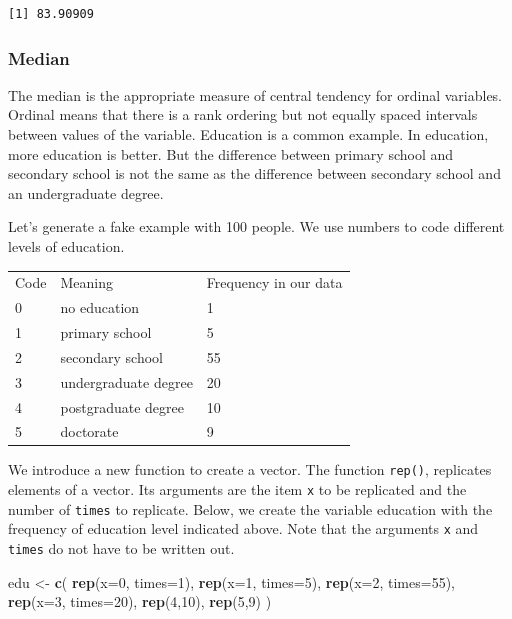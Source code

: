\documentclass[]{book}
\newenvironment{Shaded}{\begin{snugshade}}{\end{snugshade}}
\newcommand{\KeywordTok}[1]{\textcolor[rgb]{0.13,0.29,0.53}{\textbf{#1}}}
\newcommand{\DataTypeTok}[1]{\textcolor[rgb]{0.13,0.29,0.53}{#1}}
\newcommand{\DecValTok}[1]{\textcolor[rgb]{0.00,0.00,0.81}{#1}}
\newcommand{\StringTok}[1]{\textcolor[rgb]{0.31,0.60,0.02}{#1}}
\newcommand{\NormalTok}[1]{#1}
\theoremstyle{definition}
\theoremstyle{definition}
\theoremstyle{definition}
\theoremstyle{remark}
\begin{document}
\begin{verbatim}
[1] 83.90909
\end{verbatim}

\subsubsection{Median}\label{median}

The median is the appropriate measure of central tendency for ordinal
variables. Ordinal means that there is a rank ordering but not equally
spaced intervals between values of the variable. Education is a common
example. In education, more education is better. But the difference
between primary school and secondary school is not the same as the
difference between secondary school and an undergraduate degree.

Let's generate a fake example with 100 people. We use numbers to code
different levels of education.

\begin{longtable}[]{@{}lll@{}}
\toprule
Code & Meaning & Frequency in our data\tabularnewline
0 & no education & 1\tabularnewline
1 & primary school & 5\tabularnewline
2 & secondary school & 55\tabularnewline
3 & undergraduate degree & 20\tabularnewline
4 & postgraduate degree & 10\tabularnewline
5 & doctorate & 9\tabularnewline
\bottomrule
\end{longtable}

We introduce a new function to create a vector. The function
\texttt{rep()}, replicates elements of a vector. Its arguments are the
item \texttt{x} to be replicated and the number of \texttt{times} to
replicate. Below, we create the variable education with the frequency of
education level indicated above. Note that the arguments \texttt{x} and
\texttt{times} do not have to be written out.

\begin{Shaded}
\begin{Highlighting}[]
\NormalTok{edu <-}\StringTok{ }\KeywordTok{c}\NormalTok{( }\KeywordTok{rep}\NormalTok{(}\DataTypeTok{x=}\DecValTok{0}\NormalTok{, }\DataTypeTok{times=}\DecValTok{1}\NormalTok{), }\KeywordTok{rep}\NormalTok{(}\DataTypeTok{x=}\DecValTok{1}\NormalTok{, }\DataTypeTok{times=}\DecValTok{5}\NormalTok{), }\KeywordTok{rep}\NormalTok{(}\DataTypeTok{x=}\DecValTok{2}\NormalTok{, }\DataTypeTok{times=}\DecValTok{55}\NormalTok{),}
          \KeywordTok{rep}\NormalTok{(}\DataTypeTok{x=}\DecValTok{3}\NormalTok{, }\DataTypeTok{times=}\DecValTok{20}\NormalTok{), }\KeywordTok{rep}\NormalTok{(}\DecValTok{4}\NormalTok{,}\DecValTok{10}\NormalTok{), }\KeywordTok{rep}\NormalTok{(}\DecValTok{5}\NormalTok{,}\DecValTok{9}\NormalTok{) )}
\end{Highlighting}
\end{Shaded}
\end{document}
